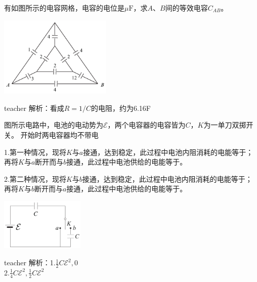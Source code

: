 \begin{example}
有如图所示的电容网格，电容的电位是$\mu\text{F}$，求$A、B$间的等效电容$C_{AB}$。
\begin{flushright}
\includegraphics[width = 0.4\textwidth]{images/elec-problem-17.pdf} 
\end{flushright}

\begin{taggedblock}{teacher}
\noindent
解析：看成$R=1/C$的电阻，约为6.16F
\end{taggedblock}
\end{example}


\begin{example}
图所示电路中，电池的电动势为$\mathcal{E}$，两个电容器的电容皆为$C$，$K$为一单刀双掷开关。
开始时两电容器均不带电

1.第一种情况，现将$K$与$a$接通，达到稳定，此过程中电池内阻消耗的电能等于\kong\kong；再将$K$与$a$断开而与$b$接通，此过程中电池供给的电能等于\kong\kong。

2.第二种情况，现将$K$与$b$接通，达到稳定，此过程中电池内阻消耗的电能等于\kong\kong；再将$K$与$b$断开而与$a$接通，此过程中电池供给的电能等于\kong\kong。
\begin{flushright}
\includegraphics[width = 0.3\textwidth]{images/elec-problem-18.pdf} 
\end{flushright}


\begin{taggedblock}{teacher}
\noindent
解析：1.$\frac{1}{2}C\mathcal{E}^2,0$
\\2.$\frac{1}{4}C\mathcal{E}^2,\frac{1}{2}C\mathcal{E}^2$
\end{taggedblock}
\end{example}


